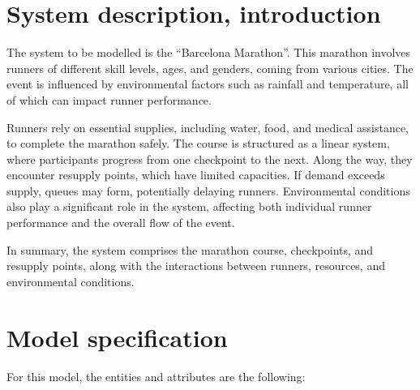 \documentclass[conference]{IEEEtran}
\begin{document}
% 
\section{System description, introduction}
The system to be modelled is the ``Barcelona Marathon''. This marathon involves runners of different skill levels, ages, and genders, coming from various cities. The event is influenced by environmental factors such as rainfall and temperature, all of which can impact runner performance. 

Runners rely on essential supplies, including water, food, and medical assistance, to complete the marathon safely. The course is structured as a linear system, where participants progress from one checkpoint to the next. Along the way, they encounter resupply points, which have limited capacities. If demand exceeds supply, queues may form, potentially delaying runners. Environmental conditions also play a significant role in the system, affecting both individual runner performance and the overall flow of the event.

In summary, the system comprises the marathon course, checkpoints, and resupply points, along with the interactions between runners, resources, and environmental conditions.


\section{Model specification}

For this model, the entities and attributes are the following:
\end{document}
